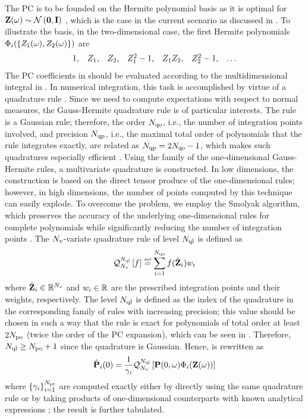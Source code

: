 The PC is to be founded on the Hermite polynomial basis as it is optimal for $\vZ(\o) \sim \normal{\vZero}{\mI}$ \cite{xiu2002}, which is the case in the current scenario as discussed in . To illustrate the basis, in the two-dimensional case, the first Hermite polynomials $\Phi_i(\{ Z_1(\omega), Z_2(\omega) \})$ are
\[
  \begin{array}{lllllll}
  1, & Z_1, & Z_2, & Z_1^2 - 1, & Z_1 Z_2, & Z_2^2 - 1, & \dotsc
  \end{array}
\]
The PC coefficients in  should be evaluated according to the multidimensional integral in . In numerical integration, this task is accomplished by virtue of a quadrature rule \cite{press2007}. Since we need to compute expectations with respect to normal measures, the Gauss-Hermite quadrature rule is of particular interests. The rule is a Gaussian rule; therefore, the order $N_\text{qo}$, i.e., the number of integration points involved, and precision $N_\text{qp}$, i.e., the maximal total order of polynomials that the rule integrates exactly, are related as $N_\text{qp} = 2 N_\text{qo} - 1$, which makes such quadratures especially efficient \cite{heiss2008}. Using the family of the one-dimensional Gauss-Hermite rules, a multivariate quadrature is constructed. In low dimensions, the construction is based on the direct tensor produce of the one-dimensional rules; however, in high dimensions, the number of points computed by this technique can easily explode. To overcome the problem, we employ the Smolyak algorithm, which preserves the accuracy of the underlying one-dimensional rules for complete polynomials while significantly reducing the number of integration points \cite{eldred2009, maitre2010, heiss2008}. The ${N_\text{v}}$-variate quadrature rule of level $N_\text{ql}$ is defined as
\[
  \oQuad{\vars}{\qdlevel}{f} \eqdef \sum_{i = 1}^{\qdorder} f(\qdn{\vZ}_i) \qdw_i
\]
where $\hat{\mathbf{Z}}_i \in \mathbb{R}^{N_\text{v}}$ and $w_i \in \mathbb{R}$ are the prescribed integration points and their weights, respectively. The level $N_\text{ql}$ is defined as the index of the quadrature in the corresponding family of rules with increasing precision; this value should be chosen in such a way that the rule is exact for polynomials of total order at least $2 {N_\text{po}}$ (twice the order of the PC expansion), which can be seen in  \cite{eldred2009}. Therefore, $N_\text{ql} \geq {N_\text{po}} + 1$ since the quadrature is Gaussian. Hence,  is rewritten as
\[
  \hat{\mathbf{P}}_i(0) = \frac{1}{\gamma_i} \mathcal{Q}_{{N_\text{v}}}^{N_\text{ql}}\left[\mathbf{P}(0, \omega) \Phi_i(\mathbf{Z}(\omega))\right]
\]
where $\{ \gamma_i \}_{i = 1}^{{N_\text{pt}}}$ are computed exactly either by directly using the same quadrature rule or by taking products of one-dimensional counterparts with known analytical expressions \cite{xiu2010}; the result is further tabulated.

